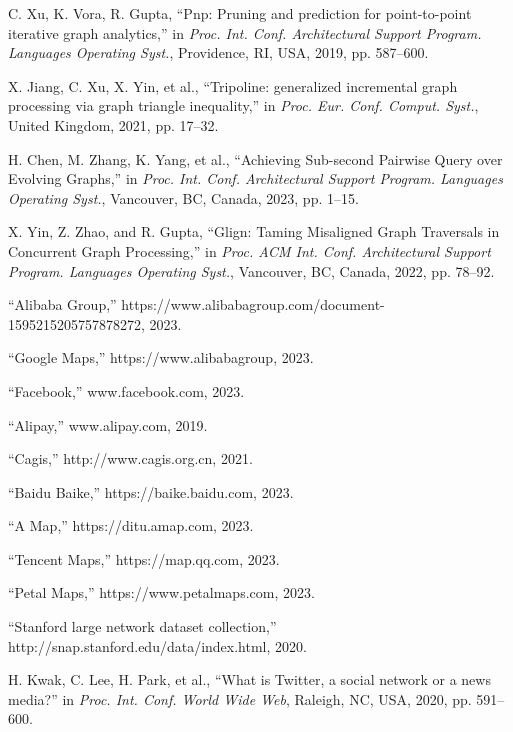 \documentclass[lettersize,journal]{IEEEtran} %
\begin{document}
\begin{thebibliography}{100}
  
  

  

  C. Xu, K. Vora, R. Gupta, ``Pnp: Pruning and prediction for point-to-point iterative graph analytics,'' in \textit{Proc. Int. Conf. Architectural Support Program. Languages Operating Syst.}, Providence, RI, USA, 2019, pp. 587--600.
  
  X. Jiang, C. Xu, X. Yin, et al., ``Tripoline: generalized incremental graph processing via graph triangle inequality,'' in \textit{Proc. Eur. Conf. Comput. Syst.}, United Kingdom, 2021, pp. 17--32.

  H. Chen, M. Zhang, K. Yang, et al., ``Achieving Sub-second Pairwise Query over Evolving Graphs,'' in \textit{Proc. Int. Conf. Architectural Support Program. Languages Operating Syst.}, Vancouver, BC, Canada, 2023, pp. 1--15.
  
  X. Yin, Z. Zhao, and R. Gupta, ``Glign: Taming Misaligned Graph Traversals in Concurrent Graph Processing,'' in \textit{Proc. ACM Int. Conf. Architectural Support Program. Languages Operating Syst.}, Vancouver, BC, Canada, 2022, pp. 78--92.

  ``Alibaba Group,'' https://www.alibabagroup.com/document-1595215205757878272, 2023.
  
  
  ``Google Maps,'' https://www.alibabagroup, 2023.
  
  ``Facebook,'' www.facebook.com, 2023.
  
  ``Alipay,'' www.alipay.com, 2019.
  
  ``Cagis,'' http://www.cagis.org.cn, 2021.
  
  ``Baidu Baike,'' https://baike.baidu.com, 2023.
  
  ``A Map,'' https://ditu.amap.com, 2023.
  
  ``Tencent Maps,'' https://map.qq.com, 2023.
  
  ``Petal Maps,'' https://www.petalmaps.com, 2023.
  
  ``Stanford large network dataset collection,'' http://snap.stanford.edu/data/index.html, 2020.
  
  H. Kwak, C. Lee, H. Park, et al., ``What is Twitter, a social network or a news media?'' in \textit{Proc. Int. Conf. World Wide Web}, Raleigh, NC, USA, 2020, pp. 591--600.
  

\end{thebibliography}
\end{document}

